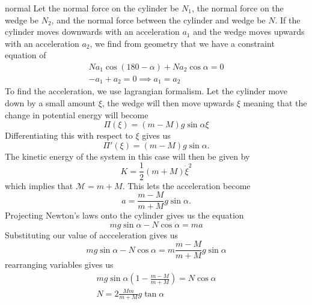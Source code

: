 \begin{solution}{normal}
Let the normal force on the cylinder be $N_1$, the normal force on the wedge be $N_2$, and the normal force between the cylinder and wedge be $N$. If the cylinder moves downwards with an acceleration $a_1$ and the wedge moves upwards with an acceleration $a_2$, we find from geometry that we have a constraint equation of 
\begin{align*}
Na_1\cos (180 - \alpha) + Na_2 \cos\alpha = 0\\
-a_1 + a_2 = 0 \implies a_1 = a_2
\end{align*}
To find the acceleration, we use lagrangian formalism. Let the cylinder move down by a small amount $\xi$, the wedge will then move upwards $\xi$ meaning that the change in potential energy will become
\[
\Pi(\xi) = (m - M)g\sin\alpha \xi
\]Differentiating this with respect to $\xi$ gives us
\[
\Pi'(\xi) = (m - M)g\sin\alpha.
\]The kinetic energy of the system in this case will then be given by
\[K = \frac{1}{2}(m + M)\dot\xi^2 
\]which implies that $\mathcal{M} = m + M.$ This lets the acceleration become
\[
a = \frac{m - M}{m + M}g\sin\alpha.
\] Projecting Newton's laws onto the cylinder gives us the equation
\[mg\sin\alpha - N\cos\alpha = ma\]
Substituting our value of accceleration gives us 
\[mg\sin\alpha - N\cos\alpha = m\frac{m - M}{m + M}g\sin\alpha\]
rearranging variables gives us 
\begin{align*}
mg\sin\alpha\left(1 - \frac{m -M}{m + M}\right) = N\cos\alpha\\
\boxed{N = 2\frac{Mm}{m + M}g\tan\alpha}
\end{align*}
\end{solution}

